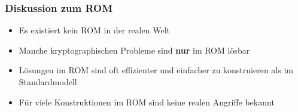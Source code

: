 \documentclass[12pt,A4]{extarticle}
\begin{document}
\subsubsection{Diskussion zum ROM}
\begin{itemize}
  \item{Es existiert kein ROM in der realen Welt}
  \item{Manche kryptographischen Probleme sind \textbf{nur} im ROM lösbar}
  \item{Lösungen im ROM sind oft effizienter und einfacher zu konstruieren als im Standardmodell}
  \item{Für viele Konstruktionen im ROM sind keine realen Angriffe bekannt}
\end{itemize}

\newpage


\end{document}
